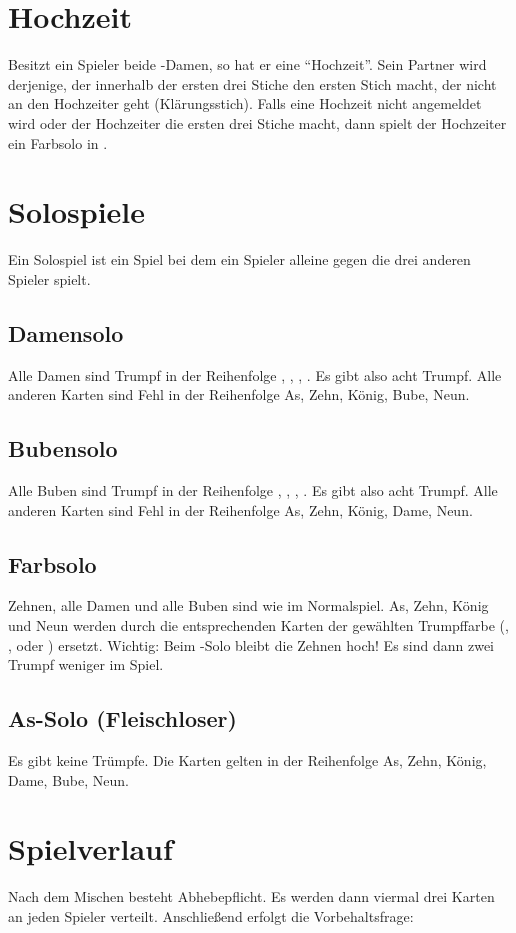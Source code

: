 \documentclass[12pt]{scrartcl}
\begin{document}
\section{Hochzeit}
Besitzt ein Spieler beide \kreuz -Damen, so hat er eine "`Hochzeit"'. Sein Partner wird derjenige, der innerhalb der ersten drei Stiche den ersten Stich macht, der nicht an den Hochzeiter geht (Klärungsstich). Falls eine Hochzeit nicht angemeldet wird oder der Hochzeiter die ersten drei Stiche macht, dann spielt der Hochzeiter ein Farbsolo in \karo.

\section{Solospiele}
Ein Solospiel ist ein Spiel bei dem ein Spieler alleine gegen die drei anderen Spieler spielt.

\subsection{Damensolo}
Alle Damen sind Trumpf in der Reihenfolge \kreuz, \pik, \herz, \karo. Es gibt also acht Trumpf. Alle anderen Karten sind Fehl in der Reihenfolge As, Zehn, König, Bube, Neun.

\subsection{Bubensolo}
Alle Buben sind Trumpf in der Reihenfolge \kreuz, \pik, \herz, \karo. Es gibt also acht Trumpf. Alle anderen Karten sind Fehl in der Reihenfolge As, Zehn, König, Dame, Neun.

\subsection{Farbsolo}
\herz Zehnen, alle Damen und alle Buben sind wie im Normalspiel. \karo As, \karo Zehn, \karo König und \karo Neun werden durch die entsprechenden Karten der gewählten Trumpffarbe (\kreuz, \pik, \herz oder \karo) ersetzt. Wichtig: Beim \herz -Solo bleibt die \herz Zehnen hoch! Es sind dann zwei Trumpf weniger im Spiel.

\subsection{As-Solo (Fleischloser)}
Es gibt keine Trümpfe. Die Karten gelten in der Reihenfolge As, Zehn, König, Dame, Bube, Neun.

\section{Spielverlauf} Nach dem
Mischen besteht Abhebepflicht. Es werden dann viermal drei Karten an jeden Spieler verteilt. Anschließend erfolgt die Vorbehaltsfrage:
\end{document}
